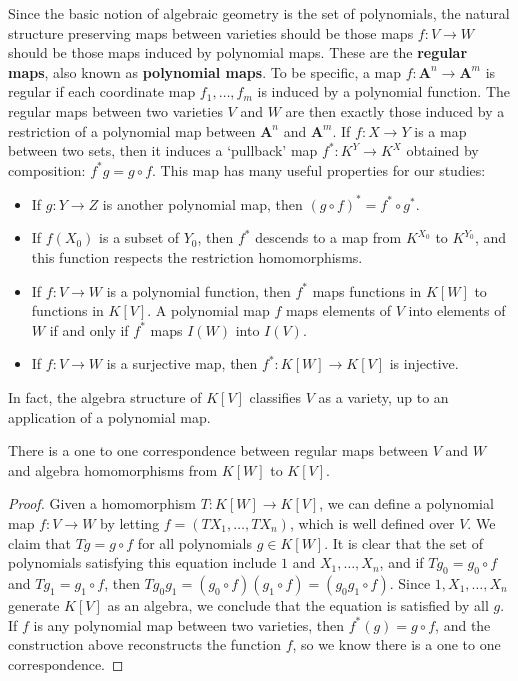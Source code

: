 Since the basic notion of algebraic geometry is the set of polynomials, the natural structure preserving maps between varieties should be those maps $f: V \to W$ should be those maps induced by polynomial maps. These are the {\bf regular maps}, also known as {\bf polynomial maps}. To be specific, a map $f: \mathbf{A}^n \to \mathbf{A}^m$ is regular if each coordinate map $f_1, \dots, f_m$ is induced by a polynomial function. The regular maps between two varieties $V$ and $W$ are then exactly those induced by a restriction of a polynomial map between $\mathbf{A}^n$ and $\mathbf{A}^m$. If $f: X \to Y$ is a map between two sets, then it induces a `pullback' map $f^*: K^Y \to K^X$ obtained by composition: $f^*g = g \circ f$. This map has many useful properties for our studies:
%
\begin{itemize}
    \item If $g: Y \to Z$ is another polynomial map, then $(g \circ f)^* = f^* \circ g^*$.
    \item If $f(X_0)$ is a subset of $Y_0$, then $f^*$ descends to a map from $K^{X_0}$ to $K^{Y_0}$, and this function respects the restriction homomorphisms.
    \item If $f: V \to W$ is a polynomial function, then $f^*$ maps functions in $K[W]$ to functions in $K[V]$. A polynomial map $f$ maps elements of $V$ into elements of $W$ if and only if $f^*$ maps $I(W)$ into $I(V)$.
    \item If $f: V \to W$ is a surjective map, then $f^*: K[W] \to K[V]$ is injective.
\end{itemize}
%
In fact, the algebra structure of $K[V]$ classifies $V$ as a variety, up to an application of a polynomial map.

\begin{prop}
    There is a one to one correspondence between regular maps between $V$ and $W$ and algebra homomorphisms from $K[W]$ to $K[V]$.
\end{prop}
\begin{proof}
    Given a homomorphism $T: K[W] \to K[V]$, we can define a polynomial map $f: V \to W$ by letting $f = (TX_1, \dots, TX_n)$, which is well defined over $V$. We claim that $Tg = g \circ f$ for all polynomials $g \in K[W]$. It is clear that the set of polynomials satisfying this equation include $1$ and $X_1, \dots, X_n$, and if $Tg_0 = g_0 \circ f$ and $Tg_1 = g_1 \circ f$, then $Tg_0g_1 = (g_0 \circ f)(g_1 \circ f) = (g_0g_1 \circ f)$. Since $1,X_1, \dots, X_n$ generate $K[V]$ as an algebra, we conclude that the equation is satisfied by all $g$. If $f$ is any polynomial map between two varieties, then $f^*(g) = g \circ f$, and the construction above reconstructs the function $f$, so we know there is a one to one correspondence.
\end{proof}

